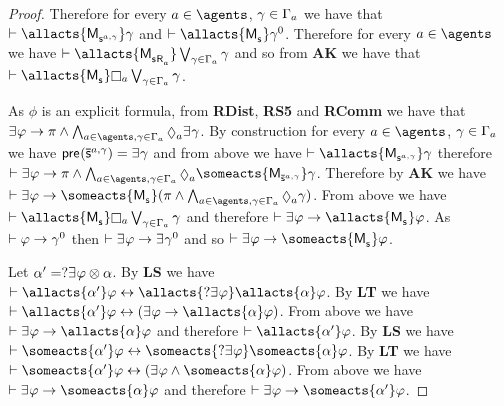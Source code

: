 \begin{proof}
Therefore for every $\agentA \in \agents$, $\gamma \in \Gamma_a$ we have that $\proves \allacts{\aPModel{\aStateS[\agentA,\gamma]}} \gamma$ and $\proves \allacts{\aPModel{\aStateS}} \gamma^0$.
Therefore for every $\agentA \in \agents$ we have $\proves \allacts{\aPModel{\aStateS \aAccessibility{\agentA}}} \bigvee_{\gamma \in \Gamma_\agentA} \gamma$ and so from {\bf AK} we have that $\proves \allacts{\aPModel{\aStateS}} \necessaryA \bigvee_{\gamma \in \Gamma_\agentA} \gamma$.

As $\phi$ is an explicit formula, from {\bf RDist}, {\bf RS5} and {\bf RComm} we have that $\somerefs \phi \implies \pi \land \bigwedge_{\agentA \in \agents, \gamma \in \Gamma_\agentA} \possibleA \somerefs \gamma$.
By construction for every $\agentA \in \agents$, $\gamma \in \Gamma_a$ we have $\aPrecondition(\aPStateS[\agentA,\gamma]) = \somerefs \gamma$ and from above we have $\proves \allacts{\aPModel{\aStateS[\agentA,\gamma]}} \gamma$ therefore $\proves \somerefs \phi \implies \pi \land \bigwedge_{\agentA \in \agents, \gamma \in \Gamma_\agentA} \possibleA \someacts{\aPModel{\aPStateS[\agentA,\gamma]}} \gamma$.
Therefore by {\bf AK} we have $\proves \somerefs \phi \implies \someacts{\aPModel{\aStateS}} (\pi \land \bigwedge_{\agentA \in \agents, \gamma \in \Gamma_\agentA} \possibleA \gamma)$.
From above we have $\proves \allacts{\aPModel{\aStateS}} \necessaryA \bigvee_{\gamma \in \Gamma_\agentA} \gamma$ and therefore $\proves \somerefs \phi \implies \allacts{\aPModel{\aStateS}} \phi$.
As $\vdash \varphi \rightarrow \gamma^0$ then $\proves \somerefs \phi \implies \somerefs \gamma^0$ and so $\proves \somerefs \phi \implies \someacts{\aPModel{\aStateS}} \phi$.

Let $\alpha' = \test{\somerefs \phi} \compose \alpha$.
By {\bf LS} we have $\proves \allacts{\alpha'} \phi \iff \allacts{\test{\somerefs \phi}} \allacts{\alpha} \phi$.
By {\bf LT} we have $\proves \allacts{\alpha'} \phi \iff (\somerefs \phi \implies \allacts{\alpha} \phi)$.
From above we have $\proves \somerefs \phi \implies \allacts{\alpha} \phi$ and therefore $\proves \allacts{\alpha'} \phi$.
By {\bf LS} we have $\proves \someacts{\alpha'} \phi \iff \someacts{\test{\somerefs \phi}} \someacts{\alpha} \phi$.
By {\bf LT} we have $\proves \someacts{\alpha'} \phi \iff (\somerefs \phi \land \someacts{\alpha} \phi)$.
From above we have $\proves \somerefs \phi \implies \someacts{\alpha} \phi$ and therefore $\proves \somerefs \phi \implies \someacts{\alpha'} \phi$.
\end{proof}

